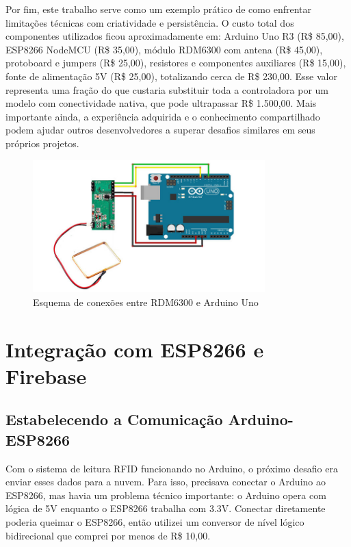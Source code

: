 Por fim, este trabalho serve como um exemplo prático de como enfrentar limitações técnicas com criatividade e persistência. O custo total dos componentes utilizados ficou aproximadamente em: Arduino Uno R3 (R\$ 85,00), ESP8266 NodeMCU (R\$ 35,00), módulo RDM6300 com antena (R\$ 45,00), protoboard e jumpers (R\$ 25,00), resistores e componentes auxiliares (R\$ 15,00), fonte de alimentação 5V (R\$ 25,00), totalizando cerca de R\$ 230,00. Esse valor representa uma fração do que custaria substituir toda a controladora por um modelo com conectividade nativa, que pode ultrapassar R\$ 1.500,00. Mais importante ainda, a experiência adquirida e o conhecimento compartilhado podem ajudar outros desenvolvedores a superar desafios similares em seus próprios projetos.

\begin{figure}[htbp!]
\centering
\includegraphics[width=0.8\textwidth]{pre-textuais/figuras/RdmcomArduino.png}
\caption{Esquema de conexões entre RDM6300 e Arduino Uno}
\label{fig:conexoes_arduino}
\end{figure}

\section{Integração com ESP8266 e Firebase}
\label{sec:integracao-firebase}

\subsection{Estabelecendo a Comunicação Arduino-ESP8266}

Com o sistema de leitura RFID funcionando no Arduino, o próximo desafio era enviar esses dados para a nuvem. Para isso, precisava conectar o Arduino ao ESP8266, mas havia um problema técnico importante: o Arduino opera com lógica de 5V enquanto o ESP8266 trabalha com 3.3V. Conectar diretamente poderia queimar o ESP8266, então utilizei um conversor de nível lógico bidirecional que comprei por menos de R\$ 10,00.

